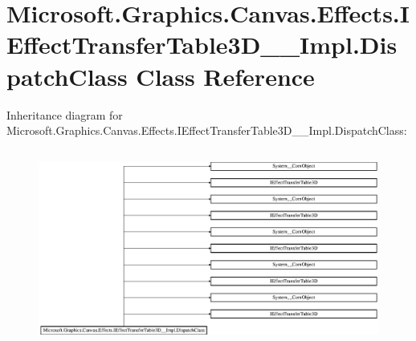 \hypertarget{class_microsoft_1_1_graphics_1_1_canvas_1_1_effects_1_1_i_effect_transfer_table3_d_____impl_1_1_dispatch_class}{}\section{Microsoft.\+Graphics.\+Canvas.\+Effects.\+I\+Effect\+Transfer\+Table3\+D\+\_\+\+\_\+\+Impl.\+Dispatch\+Class Class Reference}
\label{class_microsoft_1_1_graphics_1_1_canvas_1_1_effects_1_1_i_effect_transfer_table3_d_____impl_1_1_dispatch_class}
Inheritance diagram for Microsoft.\+Graphics.\+Canvas.\+Effects.\+I\+Effect\+Transfer\+Table3\+D\+\_\+\+\_\+\+Impl.\+Dispatch\+Class\+:\begin{figure}[H]
\begin{center}
\leavevmode
\includegraphics[height=6.511628cm]{class_microsoft_1_1_graphics_1_1_canvas_1_1_effects_1_1_i_effect_transfer_table3_d_____impl_1_1_dispatch_class}
\end{center}
\end{figure}
